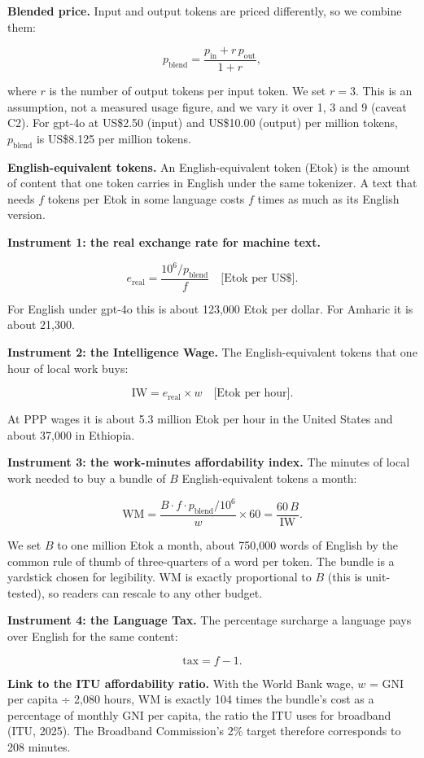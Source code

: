 \documentclass[11pt]{article}
\begin{document}
\textbf{Blended price.} Input and output tokens are priced differently, so we combine them:

\[p_{\text{blend}} = \frac{p_{\text{in}} + r\,p_{\text{out}}}{1 + r},\]

where \(r\) is the number of output tokens per input token. We set \(r = 3\). This is an assumption, not a measured usage figure, and we vary it over 1, 3 and 9 (caveat C2). For gpt-4o at US\$2.50 (input) and US\$10.00 (output) per million tokens, \(p_{\text{blend}}\) is US\$8.125 per million tokens.

\textbf{English-equivalent tokens.} An English-equivalent token (Etok) is the amount of content that one token carries in English under the same tokenizer. A text that needs \(f\) tokens per Etok in some language costs \(f\) times as much as its English version.

\textbf{Instrument 1: the real exchange rate for machine text.}

\[e_{\text{real}} = \frac{10^6 / p_{\text{blend}}}{f} \quad \text{[Etok per US\$]}.\]

For English under gpt-4o this is about 123,000 Etok per dollar. For Amharic it is about 21,300.

\textbf{Instrument 2: the Intelligence Wage.} The English-equivalent tokens that one hour of local work buys:

\[\mathrm{IW} = e_{\text{real}} \times w \quad \text{[Etok per hour]}.\]

At PPP wages it is about 5.3 million Etok per hour in the United States and about 37,000 in Ethiopia.

\textbf{Instrument 3: the work-minutes affordability index.} The minutes of local work needed to buy a bundle of \(B\) English-equivalent tokens a month:

\[\mathrm{WM} = \frac{B \cdot f \cdot p_{\text{blend}} / 10^6}{w} \times 60 = \frac{60\,B}{\mathrm{IW}}.\]

We set \(B\) to one million Etok a month, about 750,000 words of English by the common rule of thumb of three-quarters of a word per token. The bundle is a yardstick chosen for legibility. WM is exactly proportional to \(B\) (this is unit-tested), so readers can rescale to any other budget.

\textbf{Instrument 4: the Language Tax.} The percentage surcharge a language pays over English for the same content:

\[\text{tax} = f - 1.\]

\textbf{Link to the ITU affordability ratio.} With the World Bank wage, \(w\) = GNI per capita ÷ 2,080 hours, WM is exactly 104 times the bundle's cost as a percentage of monthly GNI per capita, the ratio the ITU uses for broadband (ITU, 2025). The Broadband Commission's 2\% target therefore corresponds to 208 minutes.
\end{document}
